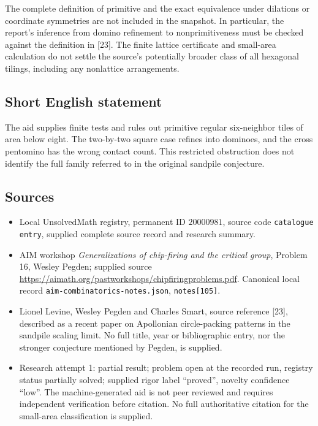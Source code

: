 \documentclass[11pt]{article}
\begin{document}
The complete definition of primitive and the exact equivalence under dilations or coordinate symmetries are not included in the snapshot. In particular, the report's inference from domino refinement to nonprimitiveness must be checked against the definition in [23]. The finite lattice certificate and small-area calculation do not settle the source's potentially broader class of all hexagonal tilings, including any nonlattice arrangements.
\subsection{Short English statement}
The aid supplies finite tests and rules out primitive regular six-neighbor tiles of area below eight. The two-by-two square case refines into dominoes, and the cross pentomino has the wrong contact count. This restricted obstruction does not identify the full family referred to in the original sandpile conjecture.
\subsection{Sources}
\begin{itemize}
\item Local UnsolvedMath registry, permanent ID $20000981$, source code \texttt{catalogue entry}, supplied complete source record and research summary.
\item AIM workshop \emph{Generalizations of chip-firing and the critical group}, Problem 16, Wesley Pegden; supplied source \url{https://aimath.org/pastworkshops/chipfiringproblems.pdf}. Canonical local record \texttt{aim-combinatorics-notes.json}, \texttt{notes[105]}.
\item Lionel Levine, Wesley Pegden and Charles Smart, source reference [23], described as a recent paper on Apollonian circle-packing patterns in the sandpile scaling limit. No full title, year or bibliographic entry, nor the stronger conjecture mentioned by Pegden, is supplied.
\item Research attempt 1: partial result; problem open at the recorded run, registry status partially solved; supplied rigor label ``proved'', novelty confidence ``low''. The machine-generated aid is not peer reviewed and requires independent verification before citation. No full authoritative citation for the small-area classification is supplied.
\end{itemize}
\end{document}
